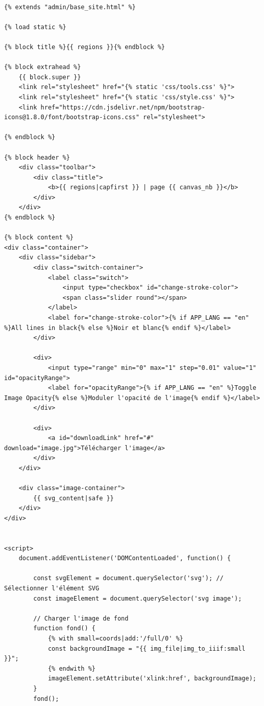 \begin{lstlisting}[language=HTML5, frame=single, breaklines=true, caption={\textit{Template} \html pour la manipulation des fichiers \svgs.}]

{% extends "admin/base_site.html" %}

{% load static %}

{% block title %}{{ regions }}{% endblock %}

{% block extrahead %}
    {{ block.super }}
    <link rel="stylesheet" href="{% static 'css/tools.css' %}">
    <link rel="stylesheet" href="{% static 'css/style.css' %}">
    <link href="https://cdn.jsdelivr.net/npm/bootstrap-icons@1.8.0/font/bootstrap-icons.css" rel="stylesheet">

{% endblock %}

{% block header %}
    <div class="toolbar">
        <div class="title">
            <b>{{ regions|capfirst }} | page {{ canvas_nb }}</b>
        </div>
    </div>
{% endblock %}

{% block content %}
<div class="container">
    <div class="sidebar">
        <div class="switch-container">
            <label class="switch">
                <input type="checkbox" id="change-stroke-color">
                <span class="slider round"></span>
            </label>
            <label for="change-stroke-color">{% if APP_LANG == "en" %}All lines in black{% else %}Noir et blanc{% endif %}</label>
        </div>

        <div>
            <input type="range" min="0" max="1" step="0.01" value="1" id="opacityRange">
            <label for="opacityRange">{% if APP_LANG == "en" %}Toggle Image Opacity{% else %}Moduler l'opacité de l'image{% endif %}</label>
        </div>

        <div>
            <a id="downloadLink" href="#" download="image.jpg">Télécharger l'image</a>
        </div>
    </div>

    <div class="image-container">
        {{ svg_content|safe }}
    </div>
</div>


<script>
    document.addEventListener('DOMContentLoaded', function() {

        const svgElement = document.querySelector('svg'); // Sélectionner l'élément SVG
        const imageElement = document.querySelector('svg image');

        // Charger l'image de fond
        function fond() {
            {% with small=coords|add:'/full/0' %}
            const backgroundImage = "{{ img_file|img_to_iiif:small }}";
            {% endwith %}
            imageElement.setAttribute('xlink:href', backgroundImage);
        }
        fond();


\end{lstlisting}
